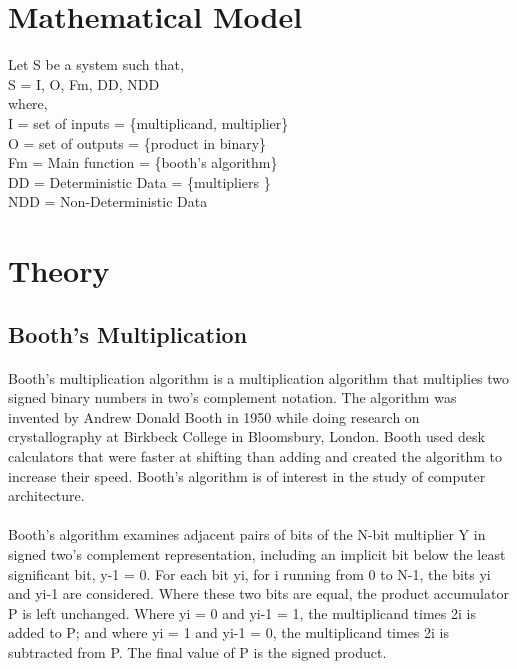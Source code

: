 \documentclass[a4paper,12pt]{article}
\begin{document}
\section{Mathematical Model}
	Let S be a system such that,							\\
	S = {I, O, Fm, DD, NDD}									\\ 	 
	where,  	 	 										\\
	I 	= 	set of inputs = 	\{multiplicand, multiplier\} 	\\
	O 	= 	set of outputs = 	\{product in binary\} 		\\
	Fm 	= 	Main function = 	\{booth's algorithm\} 		\\
	DD 	= 	Deterministic Data = \{multipliers \}				\\ 
	NDD 	= 	Non-Deterministic Data 						\\
	
\section{Theory}
	\subsection{Booth's Multiplication}
	\paragraph{} Booth's multiplication algorithm is a multiplication algorithm that multiplies two signed binary numbers in two's complement notation. The algorithm was invented by Andrew Donald Booth in 1950 while doing research on crystallography at Birkbeck College in Bloomsbury, London. Booth used desk calculators that were faster at shifting than adding and created the algorithm to increase their speed. Booth's algorithm is of interest in the study of computer architecture.
	\paragraph{} Booth's algorithm examines adjacent pairs of bits of the N-bit multiplier Y in signed two's complement representation, including an implicit bit below the least significant bit, y-1 = 0. For each bit yi, for i running from 0 to N-1, the bits yi and yi-1 are considered. Where these two bits are equal, the product accumulator P is left unchanged. Where yi = 0 and yi-1 = 1, the multiplicand times 2i is added to P; and where yi = 1 and yi-1 = 0, the multiplicand times 2i is subtracted from P. The final value of P is the signed product.
\end{document}
